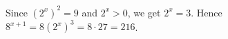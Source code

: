 Since $(2^x)^2=9 $ and $ 2^x>0 $, we get $ 2^x=3 $. Hence $ 8^{x+1}=8(2^x)^3=8\cdot27=\boxed{216}$.
